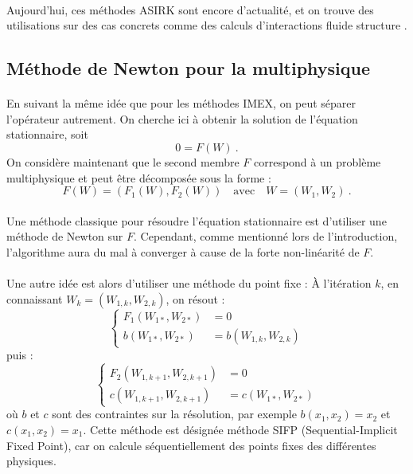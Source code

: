     \paragraph{}
    Aujourd'hui, ces méthodes ASIRK sont encore d'actualité, et on trouve des utilisations sur des cas concrets comme des calculs d'interactions fluide structure \cite{HuangPerssonZahr2019}.


  \subsection{Méthode de Newton pour la multiphysique}

    \paragraph{}
    En suivant la même idée que pour les méthodes IMEX, on peut séparer l'opérateur autrement.
    On cherche ici à obtenir la solution de l'équation stationnaire, soit
    \[0 = F\left(W\right)\ .\]
    On considère maintenant que le second membre $F$ correspond à un problème multiphysique et peut être décomposée sous la forme :
    \[F\left(W\right) = \left(F_1\left(W\right), F_2\left(W\right)\right) \quad\textrm{avec}\quad W = \left(W_1, W_2\right)\ .\]

    \paragraph{}
    Une méthode classique pour résoudre l'équation stationnaire est d'utiliser une méthode de Newton sur $F$.
    Cependant, comme mentionné lors de l'introduction, l'algorithme aura du mal à converger à cause de la forte non-linéarité de $F$.

    \paragraph{}
    Une autre idée est alors d'utiliser une méthode du point fixe :
    À l'itération $k$, en connaissant $W_k = \left(W_{1,k}, W_{2,k}\right)$, on résout :
    \[\left\{\begin{aligned}
      F_1\left(W_{1*}, W_{2*}\right) &= 0 \\
      b  \left(W_{1*}, W_{2*}\right) &= b\left(W_{1,k}, W_{2,k}\right)
    \end{aligned}\right.\]
    puis :
    \[\left\{\begin{aligned}
      F_2\left(W_{1,k+1}, W_{2,k+1}\right) &= 0 \\
      c  \left(W_{1,k+1}, W_{2,k+1}\right) &= c\left(W_{1*}, W_{2*}\right)
    \end{aligned}\right.\]
    où $b$ et $c$ sont des contraintes sur la résolution, par exemple $b\left(x_1, x_2\right) = x_2$ et $c\left(x_1, x_2\right) = x_1$.
    Cette méthode est désignée méthode SIFP (Sequential-Implicit Fixed Point), car on calcule séquentiellement des points fixes des différentes physiques.

